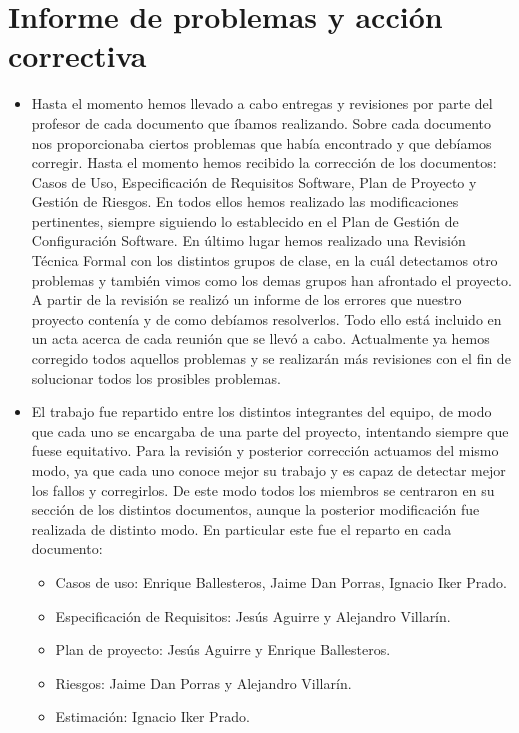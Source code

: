 \documentclass[spanish,a4paper,11pt, twoside]{report}	%
\begin{document}
\chapter{ \hspace{0.25cm}Informe de problemas y acción correctiva}
	\begin{itemize} 
		\item Hasta el momento hemos llevado a cabo entregas y revisiones por parte del profesor de cada documento que íbamos realizando. Sobre cada documento nos proporcionaba ciertos problemas que había encontrado y que debíamos corregir. Hasta el momento hemos recibido la corrección de los documentos: Casos de Uso, Especificación de Requisitos Software, Plan de Proyecto y Gestión de Riesgos. En todos ellos hemos realizado las modificaciones pertinentes, siempre siguiendo lo establecido en el Plan de Gestión de Configuración Software. En último lugar hemos realizado una Revisión Técnica Formal con los distintos grupos de clase, en la cuál detectamos otro problemas y también vimos como los demas grupos han afrontado el proyecto. A partir de la revisión se realizó un informe de los errores que nuestro proyecto contenía y de como debíamos resolverlos. Todo ello está incluido en un acta acerca de cada reunión que se llevó a cabo. Actualmente ya hemos corregido todos aquellos problemas y se realizarán más revisiones con el fin de solucionar todos los prosibles problemas.
		\item El trabajo fue repartido entre los distintos integrantes del equipo, de modo que cada uno se encargaba de una parte del proyecto, intentando siempre que fuese equitativo. Para la revisión y posterior corrección actuamos del mismo modo, ya que cada uno conoce mejor su trabajo y es capaz de detectar mejor los fallos y corregirlos. De este modo todos los miembros se centraron en su sección de los distintos documentos, aunque la posterior modificación fue realizada de distinto modo. En particular este fue el reparto en cada documento:
		\begin{itemize}
			\item Casos de uso: Enrique Ballesteros, Jaime Dan Porras, Ignacio Iker Prado.
			\item Especificación de Requisitos: Jesús Aguirre y Alejandro Villarín.
			\item Plan de proyecto:  Jesús Aguirre y Enrique Ballesteros.
			\item Riesgos: Jaime Dan Porras y Alejandro Villarín.
			\item Estimación: Ignacio Iker Prado.
		\end{itemize}
	\end{itemize}
\end{document}
